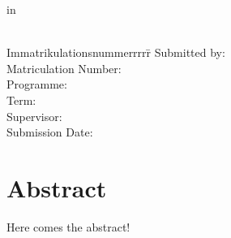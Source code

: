 \begin{centering}
		\Large \textbf{\Institution}\\
		\Large \Programme \\
		\vfill
		\LARGE \textbf{\Title} \\
		\Subtitle \\
		\vfill
		\LARGE \AsssignmentName \\ %
		\Large in \\
		\LARGE  \Class \\
		\vfill
		\begin{small}
			\begin{doublespace}
				\begin{tabbing}
					Immatrikulationsnummerrrrr\=\kill
					Submitted by:\>\Name\\
					Matriculation Number:\>\MatrikelNummer\\
					Programme:\>\Programme\\
					Term:\>\Semester\\
					Supervisor:\>\Supervisor\\
					Submission Date:\>\Date
				\end{tabbing}
			\end{doublespace}
		\end{small}
		
	\end{centering}\vspace{1cm}

\newpage
\tableofcontents
\listoftables
\listoffigures
\newpage
{}


\section{Abstract}
Here comes the abstract!
\newpage